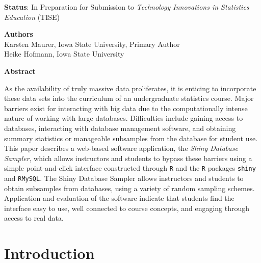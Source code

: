 \documentclass[11pt]{isuthesis}\usepackage[]{graphicx}\usepackage[]{color}
\begin{document}


 
\begin{center}
\textbf{Status}: In Preparation for Submission to \textit{Technology Innovations in Statistics Education} (TISE)\\
\end{center} 

\begin{center}
\textbf{Authors}\\
Karsten Maurer, Iowa State University, Primary Author\\
Heike Hofmann, Iowa State University\\
\end{center}


\begin{center}
\textbf{Abstract}\\
\end{center}

As the availability of truly massive data proliferates, it is enticing to incorporate these data sets into the curriculum of an undergraduate statistics course.  Major barriers exist for interacting with big data due to the computationally intense nature of working with large databases.  Difficulties include gaining access to databases, interacting with database management software, and obtaining summary statistics or manageable subsamples from the database for student use.  This paper describes a web-based software application, the \textit{Shiny Database Sampler}, which allows instructors and students to bypass these barriers using a simple point-and-click interface constructed through \texttt{R} and the \texttt{R} packages \texttt{shiny} and \texttt{RMySQL}. The Shiny Database Sampler allows instructors and students to obtain subsamples from databases, using a variety of random sampling schemes. Application and evaluation of the software indicate that students find the interface easy to use, well connected to course concepts, and engaging through access to real data.


\section{Introduction}
\end{document}
